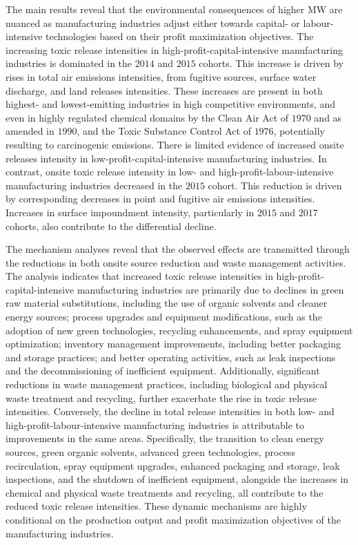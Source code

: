 \documentclass[authoryear, preprint, twocolumn, 1p]{elsarticle}
\begin{document}
    The main results reveal that the environmental consequences of higher MW are nuanced as manufacturing industries adjust either towards capital- or labour-intensive technologies based on their profit maximization objectives. The increasing toxic release intensities in high-profit-capital-intensive manufacturing industries is dominated in the $2014$ and $2015$ cohorts. This increase is driven by rises in total air emissions intensities, from fugitive sources, surface water discharge, and land releases intensities. These increases are present in both highest- and lowest-emitting industries in high competitive environments, and even in highly regulated chemical domains by the Clean Air Act of $1970$ and as amended in $1990$, and the Toxic Substance Control Act of $1976$, potentially resulting to carcinogenic emissions. There is limited evidence of increased onsite releases intensity in low-profit-capital-intensive manufacturing industries. In contrast, onsite toxic release intensity in low- and high-profit-labour-intensive manufacturing industries decreased in the $2015$ cohort. This reduction is driven by corresponding decreases in point and fugitive air emissions intensities. Increases in surface impoundment intensity, particularly in $2015$ and $2017$ cohorts, also contribute to the differential decline.

    The mechanism analyses reveal that the observed effects are transmitted through the reductions in both onsite source reduction and waste management activities. The analysis indicates that increased toxic release intensities in high-profit-capital-intensive manufacturing industries are primarily due to declines in green raw material substitutions, including the use of organic solvents and cleaner energy sources; process upgrades and equipment modifications, such as the adoption of new green technologies, recycling enhancements, and spray equipment optimization; inventory management improvements, including better packaging and storage practices; and better operating activities, such as leak inspections and the decommissioning of inefficient equipment. Additionally, significant reductions in waste management practices, including biological and physical waste treatment and recycling, further exacerbate the rise in toxic release intensities. Conversely, the decline in total release intensities in both low- and high-profit-labour-intensive manufacturing industries is attributable to improvements in the same areas. Specifically, the transition to clean energy sources, green organic solvents, advanced green technologies, process recirculation, spray equipment upgrades, enhanced packaging and storage, leak inspections, and the shutdown of inefficient equipment, alongside the increases in chemical and physical waste treatments and recycling, all contribute to the reduced toxic release intensities. These dynamic mechanisms are highly conditional on the production output and profit maximization objectives of the manufacturing industries.
\end{document}
